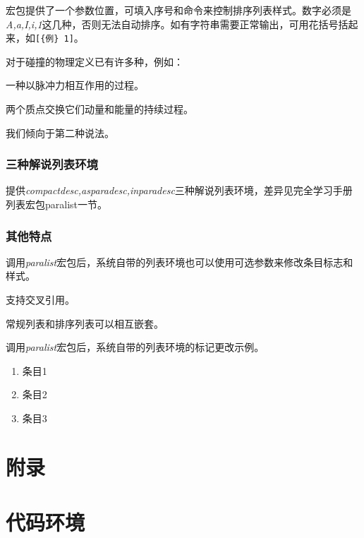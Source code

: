 宏包提供了一个参数位置，可填入序号和命令来控制排序列表样式。数字必须是\emph{A,a,I,i,1}这几种，否则无法自动排序。如有字符串需要正常输出，可用花括号括起来，如\verb|[{例} 1]|。

\begin{codeshow}
	对于碰撞的物理定义已有许多种，例如：
	\begin{compactenum}[{定义} \itshape (1)]
		\item 一种以脉冲力相互作用的过程。
		\item 两个质点交换它们动量和能量的持续过程。
	\end{compactenum}
	我们倾向于第二种说法。
\end{codeshow}

\subsubsection{三种解说列表环境}
提供\emph{compactdesc,asparadesc,inparadesc}三种解说列表环境，差异见\LaTeXe 完全学习手册列表宏包paralist一节。

\subsubsection{其他特点}
\begin{asparaenum}[(1)]
	\item 调用\emph{paralist}宏包后，系统自带的列表环境也可以使用可选参数来修改条目标志和样式。
	\item 支持交叉引用。
	\item 常规列表和排序列表可以相互嵌套。
\end{asparaenum}

\begin{codeshow}
	调用\emph{paralist}宏包后，系统自带的列表环境的标记更改示例。
	\begin{enumerate}[(1)]
		\itemsep=0pt
		\parskip=0pt
		\item 条目1
		\item 条目2
		\item 条目3
		\end{enumerate}
\end{codeshow}

\section{附录}

\section{代码环境}

